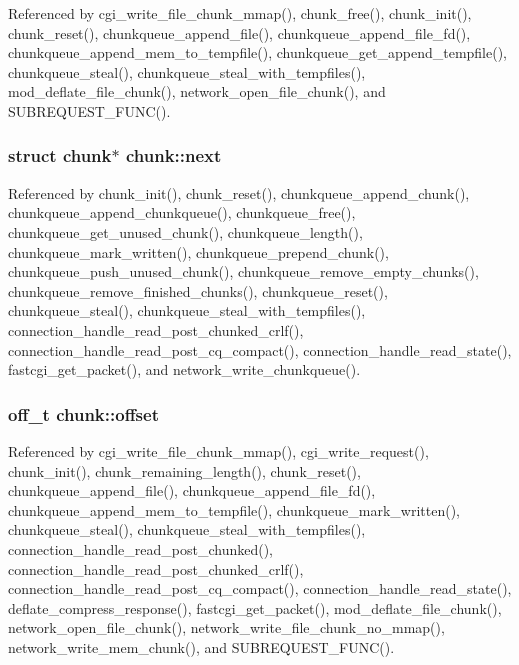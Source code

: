 Referenced by cgi\-\_\-write\-\_\-file\-\_\-chunk\-\_\-mmap(), chunk\-\_\-free(), chunk\-\_\-init(), chunk\-\_\-reset(), chunkqueue\-\_\-append\-\_\-file(), chunkqueue\-\_\-append\-\_\-file\-\_\-fd(), chunkqueue\-\_\-append\-\_\-mem\-\_\-to\-\_\-tempfile(), chunkqueue\-\_\-get\-\_\-append\-\_\-tempfile(), chunkqueue\-\_\-steal(), chunkqueue\-\_\-steal\-\_\-with\-\_\-tempfiles(), mod\-\_\-deflate\-\_\-file\-\_\-chunk(), network\-\_\-open\-\_\-file\-\_\-chunk(), and S\-U\-B\-R\-E\-Q\-U\-E\-S\-T\-\_\-\-F\-U\-N\-C().

\hypertarget{structchunk_ae1e10a6d56f2bf597d12359f5244e46a}{
\subsubsection[{next}]{\setlength{\rightskip}{0pt plus 5cm}struct {\bf chunk}$\ast$ chunk\-::next}}\label{structchunk_ae1e10a6d56f2bf597d12359f5244e46a}


Referenced by chunk\-\_\-init(), chunk\-\_\-reset(), chunkqueue\-\_\-append\-\_\-chunk(), chunkqueue\-\_\-append\-\_\-chunkqueue(), chunkqueue\-\_\-free(), chunkqueue\-\_\-get\-\_\-unused\-\_\-chunk(), chunkqueue\-\_\-length(), chunkqueue\-\_\-mark\-\_\-written(), chunkqueue\-\_\-prepend\-\_\-chunk(), chunkqueue\-\_\-push\-\_\-unused\-\_\-chunk(), chunkqueue\-\_\-remove\-\_\-empty\-\_\-chunks(), chunkqueue\-\_\-remove\-\_\-finished\-\_\-chunks(), chunkqueue\-\_\-reset(), chunkqueue\-\_\-steal(), chunkqueue\-\_\-steal\-\_\-with\-\_\-tempfiles(), connection\-\_\-handle\-\_\-read\-\_\-post\-\_\-chunked\-\_\-crlf(), connection\-\_\-handle\-\_\-read\-\_\-post\-\_\-cq\-\_\-compact(), connection\-\_\-handle\-\_\-read\-\_\-state(), fastcgi\-\_\-get\-\_\-packet(), and network\-\_\-write\-\_\-chunkqueue().

\hypertarget{structchunk_a8077bd97ac50f0730fc9f9e985d185d6}{
\subsubsection[{offset}]{\setlength{\rightskip}{0pt plus 5cm}off\-\_\-t chunk\-::offset}}\label{structchunk_a8077bd97ac50f0730fc9f9e985d185d6}


Referenced by cgi\-\_\-write\-\_\-file\-\_\-chunk\-\_\-mmap(), cgi\-\_\-write\-\_\-request(), chunk\-\_\-init(), chunk\-\_\-remaining\-\_\-length(), chunk\-\_\-reset(), chunkqueue\-\_\-append\-\_\-file(), chunkqueue\-\_\-append\-\_\-file\-\_\-fd(), chunkqueue\-\_\-append\-\_\-mem\-\_\-to\-\_\-tempfile(), chunkqueue\-\_\-mark\-\_\-written(), chunkqueue\-\_\-steal(), chunkqueue\-\_\-steal\-\_\-with\-\_\-tempfiles(), connection\-\_\-handle\-\_\-read\-\_\-post\-\_\-chunked(), connection\-\_\-handle\-\_\-read\-\_\-post\-\_\-chunked\-\_\-crlf(), connection\-\_\-handle\-\_\-read\-\_\-post\-\_\-cq\-\_\-compact(), connection\-\_\-handle\-\_\-read\-\_\-state(), deflate\-\_\-compress\-\_\-response(), fastcgi\-\_\-get\-\_\-packet(), mod\-\_\-deflate\-\_\-file\-\_\-chunk(), network\-\_\-open\-\_\-file\-\_\-chunk(), network\-\_\-write\-\_\-file\-\_\-chunk\-\_\-no\-\_\-mmap(), network\-\_\-write\-\_\-mem\-\_\-chunk(), and S\-U\-B\-R\-E\-Q\-U\-E\-S\-T\-\_\-\-F\-U\-N\-C().

